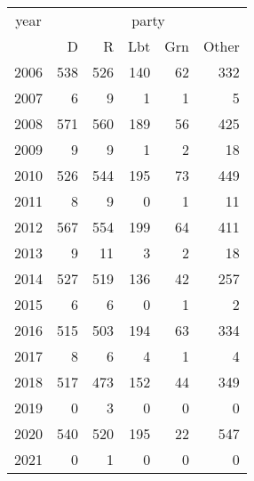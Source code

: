 \footnotesize\begin{tabular}[t]{lrrrrr}
\toprule
\multicolumn{1}{c}{year} & \multicolumn{5}{c}{party} \\
\cmidrule(l{3pt}r{3pt}){1-1} \cmidrule(l{3pt}r{3pt}){2-6}
  & D & R & Lbt & Grn & Other\\
\midrule
2006 & 538 & 526 & 140 & 62 & 332\\
2007 & 6 & 9 & 1 & 1 & 5\\
2008 & 571 & 560 & 189 & 56 & 425\\
2009 & 9 & 9 & 1 & 2 & 18\\
2010 & 526 & 544 & 195 & 73 & 449\\
2011 & 8 & 9 & 0 & 1 & 11\\
2012 & 567 & 554 & 199 & 64 & 411\\
2013 & 9 & 11 & 3 & 2 & 18\\
2014 & 527 & 519 & 136 & 42 & 257\\
2015 & 6 & 6 & 0 & 1 & 2\\
2016 & 515 & 503 & 194 & 63 & 334\\
2017 & 8 & 6 & 4 & 1 & 4\\
2018 & 517 & 473 & 152 & 44 & 349\\
2019 & 0 & 3 & 0 & 0 & 0\\
2020 & 540 & 520 & 195 & 22 & 547\\
2021 & 0 & 1 & 0 & 0 & 0\\
\bottomrule
\end{tabular}
